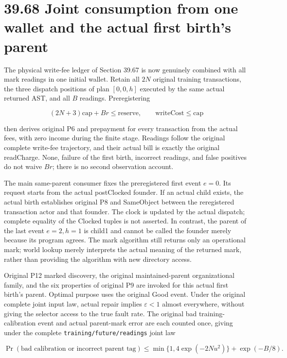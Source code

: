 \documentclass[
  english,
  11pt,
  oneside]{book}
\begin{document}
\section{39.68 Joint consumption from one wallet and the actual first birth's parent}\label{joint-consumption-from-one-wallet-and-the-actual-first-births-parent}

The physical write-fee ledger of Section 39.67 is now genuinely combined with all mark readings in one initial wallet. Retain all \(2N\) original training transactions, the three dispatch positions of plan \([0,0,h]\) executed by the same actual returned AST, and all \(B\) readings. Preregistering

\[(2N+3)\mathrm{cap}+B r\le\mathrm{reserve},
\qquad \text{writeCost}\le\mathrm{cap}\]

then derives original P6 and prepayment for every transaction from the actual fees, with zero income during the finite stage. Readings follow the original complete write-fee trajectory, and their actual bill is exactly the original readCharge. None, failure of the first birth, incorrect readings, and false positives do not waive \(B r\); there is no second observation account.

The main same-parent consumer fixes the preregistered first event \(e=0\). Its request starts from the actual postClocked founder. If an actual child exists, the actual birth establishes original P8 and SameObject between the reregistered transaction actor and that founder. The clock is updated by the actual dispatch; complete equality of the Clocked tuples is not asserted. In contrast, the parent of the last event \(e=2,h=1\) is child1 and cannot be called the founder merely because its program agrees. The mark algorithm still returns only an operational mark; world lookup merely interprets the actual meaning of the returned mark, rather than providing the algorithm with new directory access.

Original P12 marked discovery, the original maintained-parent organizational family, and the six properties of original P9 are invoked for this actual first birth's parent. Optimal purpose uses the original Good event. Under the original complete joint input law, actual repair implies \(\varepsilon<1\) almost everywhere, without giving the selector access to the true fault rate. The original bad training-calibration event and actual parent-mark error are each counted once, giving under the complete \nolinkurl{training/future/readings} joint law

\[\Pr(\text{bad calibration or incorrect parent tag})
\le \min\{1,4\exp(-2Nu^2)\}+\exp(-B/8).\]
\end{document}
